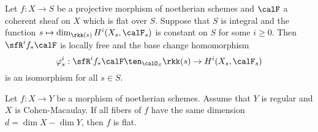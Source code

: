 
    \begin{theorem}\label{thm:Grauert_theorem}
        Let \(f:X \to S\) be a projective morphism of noetherian schemes and \(\calF\) a coherent sheaf on \(X\) which is flat over \(S\).
        Suppose that \(S\) is integral and the function \(s \mapsto \dim_{\rkk(s)} H^i(X_s,\calF_s)\) is constant on \(S\) for some \(i \geq 0\). 
        Then \(\sfR^i f_*\calF\) is locally free and the base change homomorphism
        \[
            \varphi_s^i: \sfR^i f_*\calF \ten_{\calO_S} \rkk(s) \to H^i(X_s,\calF_s)
        \]
        is an isomorphism for all \(s \in S\).
    \end{theorem}

    \begin{theorem}\label{thm:miracle_flatness}
        Let \(f:X \to Y\) be a morphism of noetherian schemes. 
        Assume that \(Y\) is regular and \(X\) is Cohen-Macaulay. 
        If all fibers of \(f\) have the same dimension \(d = \dim X - \dim Y\), then \(f\) is flat.
    \end{theorem}

